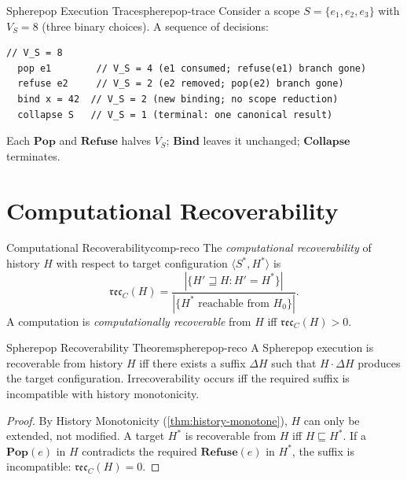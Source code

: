 \documentclass[12pt,twoside,openright]{book}
\newcommand{\csicon} {\marginpar{\tiny\color{DistBlue}\faCode}}
\newcommand{\reco}{\mathfrak{rec}}
\begin{document}
\begin{example}{Spherepop Execution Trace}{spherepop-trace}
  \csicon
  Consider a scope $S = \{e_1, e_2, e_3\}$ with
  $V_S = 8$ (three binary choices). A sequence of
  decisions:
  \begin{lstlisting}[language=Spherepop]
  // V_S = 8
  pop e1        // V_S = 4 (e1 consumed; refuse(e1) branch gone)
  refuse e2     // V_S = 2 (e2 removed; pop(e2) branch gone)
  bind x = 42  // V_S = 2 (new binding; no scope reduction)
  collapse S   // V_S = 1 (terminal: one canonical result)
  \end{lstlisting}
  Each $\mathbf{Pop}$ and $\mathbf{Refuse}$ halves
  $V_S$; $\mathbf{Bind}$ leaves it unchanged;
  $\mathbf{Collapse}$ terminates.
\end{example}

\section{Computational Recoverability}

\begin{definition}{Computational Recoverability}{comp-reco}
  The \emph{computational recoverability} of history $H$
  with respect to target configuration
  $\langle S^*, H^* \rangle$ is
  \[
    \reco_C(H)
    = \frac{|\{H' \sqsupseteq H : H' = H^*\}|}
           {|\{H^* \text{ reachable from } H_0\}|}.
  \]
  A computation is \emph{computationally recoverable}
  from $H$ iff $\reco_C(H) > 0$.
\end{definition}

\begin{theorem}{Spherepop Recoverability Theorem}{spherepop-reco}
  A Spherepop execution is recoverable from history $H$
  iff there exists a suffix $\Delta H$ such that
  $H \cdot \Delta H$ produces the target configuration.
  Irrecoverability occurs iff the required suffix is
  incompatible with history monotonicity.
\end{theorem}

\begin{proof}
  By History Monotonicity (\cref{thm:history-monotone}),
  $H$ can only be extended, not modified.
  A target $H^*$ is recoverable from $H$ iff $H \sqsubseteq H^*$.
  If a $\mathbf{Pop}(e)$ in $H$ contradicts the required
  $\mathbf{Refuse}(e)$ in $H^*$, the suffix is
  incompatible: $\reco_C(H) = 0$.
\end{proof}
\end{document}
